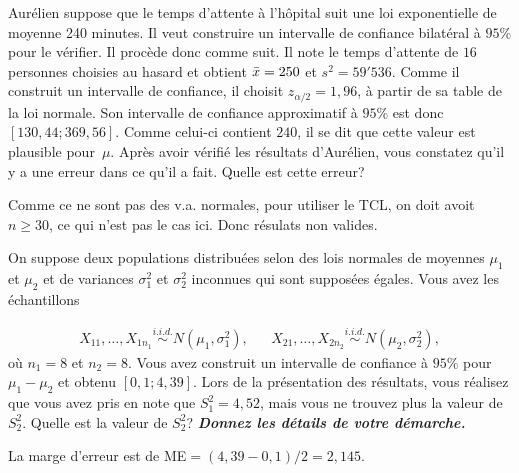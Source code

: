 \begin{questions}
\question[4]  Aurélien suppose que le temps d'attente à l'hôpital suit une loi exponentielle de moyenne 240 minutes. 
Il veut construire un intervalle de confiance bilatéral à $95\%$ pour le vérifier.
Il procède donc comme suit. 
Il note le temps d'attente de $16$ personnes choisies au hasard et obtient $\Bar{x}=250$ et $s^2=59'536$.
Comme il construit un intervalle de confiance, il choisit $z_{\alpha/2}=1,96$, à partir de sa table de la loi normale.
Son intervalle de confiance approximatif à $95\%$ est donc $[130,44;369,56]$.
Comme celui-ci contient $240$, il se dit que cette valeur est plausible pour~$\mu$. 
Après avoir vérifié les résultats d'Aurélien, vous constatez qu'il y a une erreur dans ce qu'il a fait. 
Quelle est cette erreur?
\begin{solution}
    Comme ce ne sont pas des v.a. normales, pour utiliser le TCL, on doit avoit $n\geq30$, ce qui n'est pas le cas ici. Donc résulats non valides.
\end{solution}
\vspace{4cm}
\question[8]
On suppose deux populations distribuées selon des lois normales de moyennes $\mu_1$ et $\mu_2$ et de variances $\sigma^2_1$ et $\sigma^2_2$ inconnues qui sont supposées égales. Vous avez les échantillons

\begin{align*}
X_{11}, \ldots, X_{1n_1} \overset{i.i.d.}{\sim} N(\mu_1, \sigma^2_1), & & X_{21}, \ldots, X_{2n_2} \overset{i.i.d.}{\sim} N(\mu_2, \sigma^2_2),
\end{align*}
où $n_1=8$ et $n_2=8$. Vous avez construit un intervalle de confiance à $95\%$ pour $\mu_1-\mu_2$ et obtenu $[0,1; 4,39]$. Lors de la présentation des résultats, vous réalisez que vous avez pris en note que $S^2_1=4,52$, mais vous ne trouvez plus la valeur de $S^2_2$. Quelle est la valeur de $S^2_2$? \textit{\textbf{Donnez les détails de votre démarche.}}

\begin{solution}
    La marge d'erreur est de ME$=(4,39-0,1)/2=2,145$.


\end{solution}
\end{questions}
